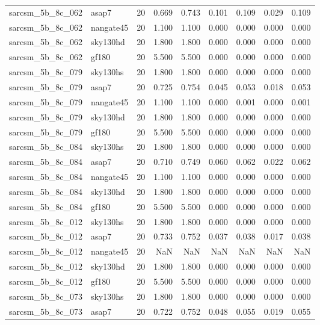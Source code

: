 \begin{tabular}{llrrrrrrr}
sarcsm\_5b\_8c\_062 & asap7 & 20 & 0.669 & 0.743 & 0.101 & 0.109 & 0.029 & 0.109 \\
sarcsm\_5b\_8c\_062 & nangate45 & 20 & 1.100 & 1.100 & 0.000 & 0.000 & 0.000 & 0.000 \\
sarcsm\_5b\_8c\_062 & sky130hd & 20 & 1.800 & 1.800 & 0.000 & 0.000 & 0.000 & 0.000 \\
sarcsm\_5b\_8c\_062 & gf180 & 20 & 5.500 & 5.500 & 0.000 & 0.000 & 0.000 & 0.000 \\
sarcsm\_5b\_8c\_079 & sky130hs & 20 & 1.800 & 1.800 & 0.000 & 0.000 & 0.000 & 0.000 \\
sarcsm\_5b\_8c\_079 & asap7 & 20 & 0.725 & 0.754 & 0.045 & 0.053 & 0.018 & 0.053 \\
sarcsm\_5b\_8c\_079 & nangate45 & 20 & 1.100 & 1.100 & 0.000 & 0.001 & 0.000 & 0.001 \\
sarcsm\_5b\_8c\_079 & sky130hd & 20 & 1.800 & 1.800 & 0.000 & 0.000 & 0.000 & 0.000 \\
sarcsm\_5b\_8c\_079 & gf180 & 20 & 5.500 & 5.500 & 0.000 & 0.000 & 0.000 & 0.000 \\
sarcsm\_5b\_8c\_084 & sky130hs & 20 & 1.800 & 1.800 & 0.000 & 0.000 & 0.000 & 0.000 \\
sarcsm\_5b\_8c\_084 & asap7 & 20 & 0.710 & 0.749 & 0.060 & 0.062 & 0.022 & 0.062 \\
sarcsm\_5b\_8c\_084 & nangate45 & 20 & 1.100 & 1.100 & 0.000 & 0.000 & 0.000 & 0.000 \\
sarcsm\_5b\_8c\_084 & sky130hd & 20 & 1.800 & 1.800 & 0.000 & 0.000 & 0.000 & 0.000 \\
sarcsm\_5b\_8c\_084 & gf180 & 20 & 5.500 & 5.500 & 0.000 & 0.000 & 0.000 & 0.000 \\
sarcsm\_5b\_8c\_012 & sky130hs & 20 & 1.800 & 1.800 & 0.000 & 0.000 & 0.000 & 0.000 \\
sarcsm\_5b\_8c\_012 & asap7 & 20 & 0.733 & 0.752 & 0.037 & 0.038 & 0.017 & 0.038 \\
sarcsm\_5b\_8c\_012 & nangate45 & 20 & NaN & NaN & NaN & NaN & NaN & NaN \\
sarcsm\_5b\_8c\_012 & sky130hd & 20 & 1.800 & 1.800 & 0.000 & 0.000 & 0.000 & 0.000 \\
sarcsm\_5b\_8c\_012 & gf180 & 20 & 5.500 & 5.500 & 0.000 & 0.000 & 0.000 & 0.000 \\
sarcsm\_5b\_8c\_073 & sky130hs & 20 & 1.800 & 1.800 & 0.000 & 0.000 & 0.000 & 0.000 \\
sarcsm\_5b\_8c\_073 & asap7 & 20 & 0.722 & 0.752 & 0.048 & 0.055 & 0.019 & 0.055 \\

\end{tabular}
